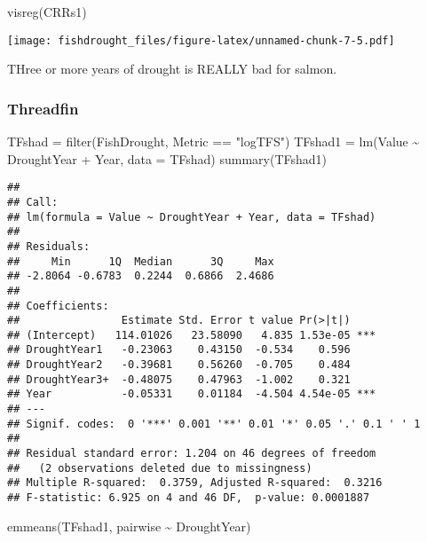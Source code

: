 \documentclass[
]{article}
\newenvironment{Shaded}{\begin{snugshade}}{\end{snugshade}}
\newcommand{\AttributeTok}[1]{\textcolor[rgb]{0.77,0.63,0.00}{#1}}
\newcommand{\FunctionTok}[1]{\textcolor[rgb]{0.00,0.00,0.00}{#1}}
\newcommand{\NormalTok}[1]{#1}
\newcommand{\OtherTok}[1]{\textcolor[rgb]{0.56,0.35,0.01}{#1}}
\newcommand{\SpecialCharTok}[1]{\textcolor[rgb]{0.00,0.00,0.00}{#1}}
\newcommand{\StringTok}[1]{\textcolor[rgb]{0.31,0.60,0.02}{#1}}
\begin{document}
\begin{Shaded}
\begin{Highlighting}[]
\FunctionTok{visreg}\NormalTok{(CRRs1)}
\end{Highlighting}
\end{Shaded}

\texttt{[image: fishdrought\_files/figure-latex/unnamed-chunk-7-5.pdf]}

THree or more years of drought is REALLY bad for salmon.

\hypertarget{threadfin}{%
\subsubsection{Threadfin}\label{threadfin}}

\begin{Shaded}
\begin{Highlighting}[]
\NormalTok{TFshad }\OtherTok{=} \FunctionTok{filter}\NormalTok{(FishDrought, Metric }\SpecialCharTok{==} \StringTok{"logTFS"}\NormalTok{)}
\NormalTok{TFshad1 }\OtherTok{=} \FunctionTok{lm}\NormalTok{(Value }\SpecialCharTok{\textasciitilde{}}\NormalTok{ DroughtYear }\SpecialCharTok{+}\NormalTok{ Year, }\AttributeTok{data =}\NormalTok{ TFshad)}
\FunctionTok{summary}\NormalTok{(TFshad1)}
\end{Highlighting}
\end{Shaded}

\begin{verbatim}
## 
## Call:
## lm(formula = Value ~ DroughtYear + Year, data = TFshad)
## 
## Residuals:
##     Min      1Q  Median      3Q     Max 
## -2.8064 -0.6783  0.2244  0.6866  2.4686 
## 
## Coefficients:
##                Estimate Std. Error t value Pr(>|t|)    
## (Intercept)   114.01026   23.58090   4.835 1.53e-05 ***
## DroughtYear1   -0.23063    0.43150  -0.534    0.596    
## DroughtYear2   -0.39681    0.56260  -0.705    0.484    
## DroughtYear3+  -0.48075    0.47963  -1.002    0.321    
## Year           -0.05331    0.01184  -4.504 4.54e-05 ***
## ---
## Signif. codes:  0 '***' 0.001 '**' 0.01 '*' 0.05 '.' 0.1 ' ' 1
## 
## Residual standard error: 1.204 on 46 degrees of freedom
##   (2 observations deleted due to missingness)
## Multiple R-squared:  0.3759, Adjusted R-squared:  0.3216 
## F-statistic: 6.925 on 4 and 46 DF,  p-value: 0.0001887
\end{verbatim}

\begin{Shaded}
\begin{Highlighting}[]
\FunctionTok{emmeans}\NormalTok{(TFshad1, pairwise }\SpecialCharTok{\textasciitilde{}}\NormalTok{ DroughtYear)}
\end{Highlighting}
\end{Shaded}
\end{document}
